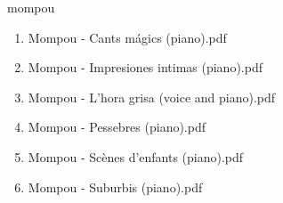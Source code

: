 \documentclass[11pt]{article}
\begin{document}
\item mompou
\label{sec-1-1-1-1-44-47}
\begin{enumerate}
\item Mompou - Cants mágics (piano).pdf
\label{sec-1-1-1-1-44-47-1}

\item Mompou - Impresiones intimas (piano).pdf
\label{sec-1-1-1-1-44-47-2}

\item Mompou - L'hora grisa (voice and piano).pdf
\label{sec-1-1-1-1-44-47-3}

\item Mompou - Pessebres (piano).pdf
\label{sec-1-1-1-1-44-47-4}

\item Mompou - Scènes d'enfants (piano).pdf
\label{sec-1-1-1-1-44-47-5}

\item Mompou - Suburbis (piano).pdf
\label{sec-1-1-1-1-44-47-6}
\end{enumerate}
\end{document}
